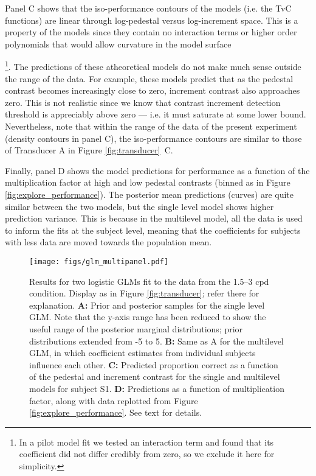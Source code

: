 \documentclass[11pt,a4paper]{article}
\begin{document}
Panel C shows that the iso-performance contours of the models (i.e. the TvC functions) are linear through log-pedestal versus log-increment space.
This is a property of the models since they contain no interaction terms or higher order polynomials that would allow curvature in the model surface {\footnote{In a pilot model fit we tested an interaction term and found that its coefficient did not differ credibly from zero, so we exclude it here for simplicity.}.
The predictions of these atheoretical models do not make much sense outside the range of the data.
For example, these models predict that as the pedestal contrast becomes increasingly close to zero, increment contrast also approaches zero.
This is not realistic since we know that contrast increment detection threshold is appreciably above zero --- i.e. it must saturate at some lower bound.
Nevertheless, note that within the range of the data of the present experiment (density contours in panel C), the iso-performance contours are similar to those of Transducer A in Figure \ref{fig:transducer}~C.

Finally, panel D shows the model predictions for performance as a function of the multiplication factor at high and low pedestal contrasts (binned as in Figure \ref{fig:explore_performance}).
The posterior mean predictions (curves) are quite similar between the two models, but the single level model shows higher prediction variance.
This is because in the multilevel model, all the data is used to inform the fits at the subject level, meaning that the coefficients for subjects with less data are moved towards the population mean.

\begin{figure}[H]
\begin{center}
\texttt{[image: figs/glm\_multipanel.pdf]}
\end{center}
\caption{
Results for two logistic GLMs fit to the data from the 1.5--3 cpd condition. Display as in Figure \ref{fig:transducer}; refer there for explanation.
\textbf{A:} Prior and posterior samples for the single level GLM.
Note that the y-axis range has been reduced to show the useful range of the posterior marginal distributions; prior distributions extended from -5 to 5.
\textbf{B:} Same as A for the multilevel GLM, in which coefficient estimates from individual subjects influence each other.
\textbf{C:} Predicted proportion correct as a function of the pedestal and increment contrast for the single and multilevel models for subject S1.
\textbf{D:} Predictions as a function of multiplication factor, along with data replotted from Figure \ref{fig:explore_performance}.
See text for details.
}
\label{fig:glm}
\end{figure}

}
\end{document}
